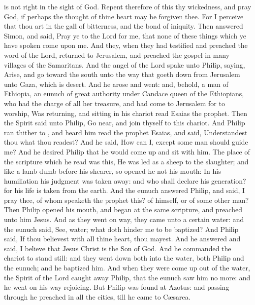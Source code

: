 {is
not
right in the sight
of
God.
Repent
therefore
of
this
thy
wickedness,
and
pray
God,
if
perhaps the
thought of
thine
heart may be
forgiven
thee.
For I
perceive that
thou
art
in the
gall of
bitterness,
and
{} the
bond of
iniquity.
Then
answered
Simon, and
said,
Pray
ye
to the
Lord
for
me,
that none of these
things
which ye have
spoken
come
upon
me.
And
they, when they had
testified
and
preached the
word of the
Lord,
returned
to
Jerusalem,
and preached the
gospel in
many
villages of the
Samaritans.
And the
angel of the
Lord
spake
unto
Philip,
saying,
Arise,
and
go
toward the
south
unto the
way
that goeth
down
from
Jerusalem
unto
Gaza,
which
is
desert.
And he
arose and
went:
and,
behold, a
man of
Ethiopia, an
eunuch of great
authority under
Candace
queen of the
Ethiopians,
who
had the charge
of
all
her
treasure, and had
come
to
Jerusalem for to
worship,
Was
returning,
and
sitting
in
his
chariot
read
Esaias the
prophet.
Then the
Spirit
said unto
Philip, Go
near,
and join
thyself to
this
chariot.
And
Philip ran
thither to
{}, and
heard
him
read the
prophet
Esaias,
and
said, Understandest
thou
what thou
readest?
And he
said,
How can
I,
except some
man should
guide
me?
And he
desired
Philip that he would come
up and
sit
with
him.
The
place of the
scripture
which he
read
was
this, He was
led
as a
sheep
to the
slaughter;
and
like a
lamb
dumb
before
his
shearer,
so opened
he
not
his
mouth:
In
his
humiliation
his
judgment was taken
away:
and
who shall
declare
his
generation?
for
his
life is
taken
from the
earth.
And the
eunuch
answered
Philip, and
said, I
pray
thee,
of
whom
speaketh the
prophet
this?
of
himself,
or
of
some other
man?
Then
Philip
opened
his
mouth,
and
began
at the
same
scripture, and
preached unto
him
Jesus.
And
as they
went
on
{}
way, they
came
unto a
certain
water:
and the
eunuch
said,
See,
{}
water;
what doth
hinder
me to be
baptized?
And
Philip
said,
If thou
believest
with
all thine
heart, thou
mayest. And he
answered
and
said, I
believe that
Jesus
Christ
is the
Son of
God.
And he
commanded the
chariot to stand
still:
and they went
down
both
into the
water,
both
Philip
and the
eunuch;
and he
baptized
him.
And
when they were come
up out
of the
water, the
Spirit of the
Lord caught
away
Philip,
that the
eunuch
saw
him no
more:
and he
went on
his
way
rejoicing.
But
Philip was
found
at
Azotus:
and passing
through he
preached in
all the
cities,
till
he
came
to
Cæsarea.

}
